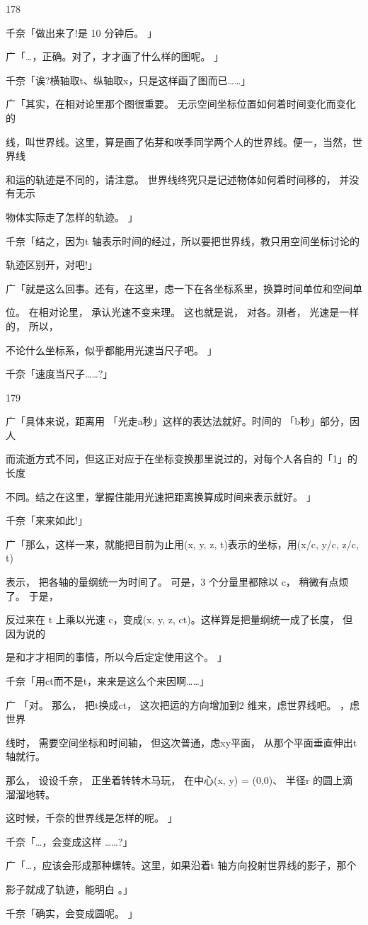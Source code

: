 178\par
千奈「做出来了!是 10 分钟后。 」\par
广「…，正确。对了，才才画了什么样的图呢。 」\par
千奈「诶?横轴取t、纵轴取x，只是这样画了图而已……」\par
广「其实，在相对论里那个图很重要。 无示空间坐标位置如何着时间变化而变化的\par
线，叫世界线。这里，算是画了佑芽和咲季同学两个人的世界线。便一，当然，世界线\par
和运的轨迹是不同的，请注意。 世界线终究只是记述物体如何着时间移的， 并没有无示\par
物体实际走了怎样的轨迹。 」\par
千奈「结之，因为t 轴表示时间的经过，所以要把世界线，教只用空间坐标讨论的\par
轨迹区别开，对吧!」\par
广「就是这么回事。还有，在这里，虑一下在各坐标系里，换算时间单位和空间单\par
位。 在相对论里， 承认光速不变来理。 这也就是说， 对各。测者， 光速是一样的， 所以，\par
不论什么坐标系，似乎都能用光速当尺子吧。 」\par
千奈「速度当尺子……?」\par

179\par
广「具体来说，距离用 「光走a秒」这样的表达法就好。时间的 「b秒」部分，因人\par
而流逝方式不同，但这正对应于在坐标变换那里说过的，对每个人各自的「1」的长度\par
不同。结之在这里，掌握住能用光速把距离换算成时间来表示就好。 」\par
千奈「来来如此!」\par
广「那么，这样一来，就能把目前为止用(x, y, z, t)表示的坐标，用(x/c, y/c, z/c, t)\par
表示， 把各轴的量纲统一为时间了。 可是，3 个分量里都除以 c， 稍微有点烦了。 于是，\par
反过来在 t 上乘以光速 c，变成(x, y, z, ct)。这样算是把量纲统一成了长度， 但因为说的\par
是和才才相同的事情，所以今后定定使用这个。 」\par
千奈「用ct而不是t，来来是这么个来因啊……」\par
广 「对。 那么， 把t换成ct， 这次把运的方向增加到2 维来，虑世界线吧。 ，虑世界\par
线时， 需要空间坐标和时间轴， 但这次普通，虑xy平面， 从那个平面垂直伸出t轴就行。\par
那么， 设设千奈， 正坐着转转木马玩， 在中心(x, y) = (0,0)、 半径r 的圆上滴溜溜地转。\par
这时候，千奈的世界线是怎样的呢。 」\par
千奈「…，会变成这样 ……?」\par
广「…，应该会形成那种螺转。这里，如果沿着t 轴方向投射世界线的影子，那个\par
影子就成了轨迹，能明白 。」\par
千奈「确实，会变成圆呢。 」\par

